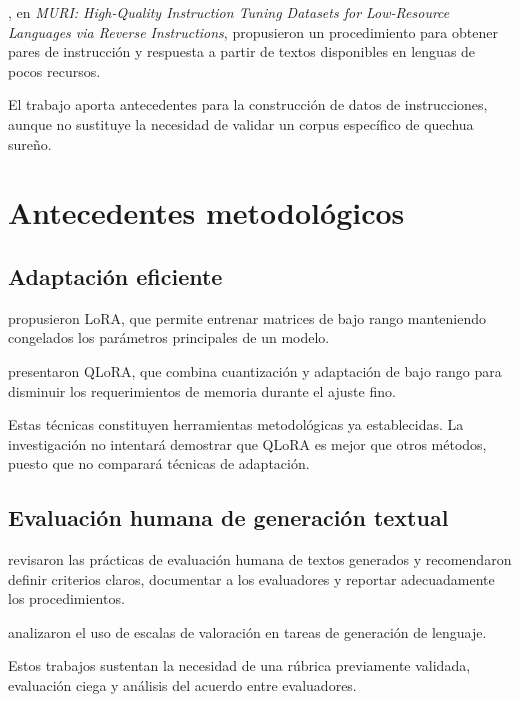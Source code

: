\textcite{Koksal2025}, en \emph{MURI: High-Quality Instruction Tuning Datasets for Low-Resource Languages via Reverse Instructions}, propusieron un procedimiento para obtener pares de instrucción y respuesta a partir de textos disponibles en lenguas de pocos recursos.

El trabajo aporta antecedentes para la construcción de datos de instrucciones, aunque no sustituye la necesidad de validar un corpus específico de quechua sureño.

\section{Antecedentes metodológicos}\label{antecedentes-metodoluxf3gicos}

\subsection{Adaptación eficiente}\label{adaptaciuxf3n-eficiente}

\textcite{Hu2021LoRA} propusieron LoRA, que permite entrenar matrices de bajo rango manteniendo congelados los parámetros principales de un modelo.

\textcite{Dettmers2023} presentaron QLoRA, que combina cuantización y adaptación de bajo rango para disminuir los requerimientos de memoria durante el ajuste fino.

Estas técnicas constituyen herramientas metodológicas ya establecidas. La investigación no intentará demostrar que QLoRA es mejor que otros métodos, puesto que no comparará técnicas de adaptación.

\subsection{Evaluación humana de generación textual}\label{evaluaciuxf3n-humana-de-generaciuxf3n-textual}

\textcite{VanDerLee2019} revisaron las prácticas de evaluación humana de textos generados y recomendaron definir criterios claros, documentar a los evaluadores y reportar adecuadamente los procedimientos.

\textcite{Amidei2019} analizaron el uso de escalas de valoración en tareas de generación de lenguaje.

Estos trabajos sustentan la necesidad de una rúbrica previamente validada, evaluación ciega y análisis del acuerdo entre evaluadores.
